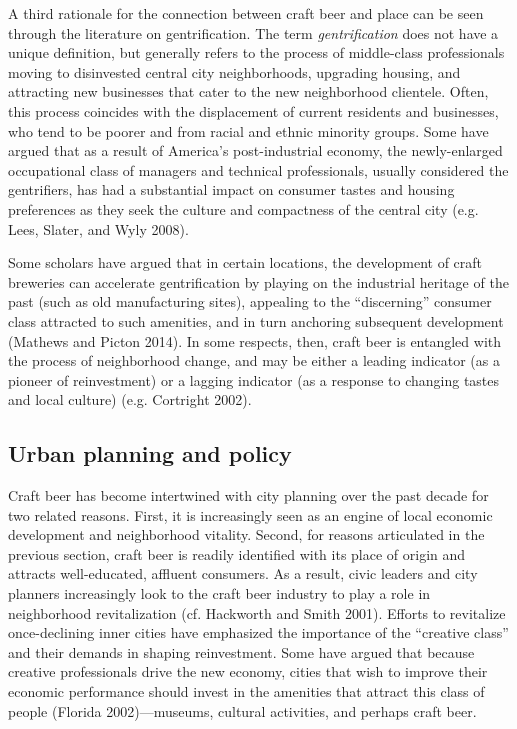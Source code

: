 \documentclass[]{article}
\begin{document}
A third rationale for the connection between craft beer and place can be
seen through the literature on gentrification. The term
\emph{gentrification} does not have a unique definition, but generally
refers to the process of middle-class professionals moving to
disinvested central city neighborhoods, upgrading housing, and
attracting new businesses that cater to the new neighborhood clientele.
Often, this process coincides with the displacement of current residents
and businesses, who tend to be poorer and from racial and ethnic
minority groups. Some have argued that as a result of America's
post-industrial economy, the newly-enlarged occupational class of
managers and technical professionals, usually considered the
gentrifiers, has had a substantial impact on consumer tastes and housing
preferences as they seek the culture and compactness of the central city
(e.g. Lees, Slater, and Wyly 2008).

Some scholars have argued that in certain locations, the development of
craft breweries can accelerate gentrification by playing on the
industrial heritage of the past (such as old manufacturing sites),
appealing to the ``discerning'' consumer class attracted to such
amenities, and in turn anchoring subsequent development (Mathews and
Picton 2014). \protect\hypertarget{move4227634296}{}{}In some respects,
then, craft beer is entangled with the process of neighborhood change,
and may be either a leading indicator (as a pioneer of reinvestment) or
a lagging indicator (as a response to changing tastes and local culture)
(e.g. Cortright 2002).

\subsection{Urban planning and policy}\label{urban-planning-and-policy}

Craft beer has become intertwined with city planning over the past
decade for two related reasons. First, it is increasingly seen as an
engine of local economic development and neighborhood vitality. Second,
for reasons articulated in the previous section, craft beer is readily
identified with its place of origin and attracts well-educated, affluent
consumers. As a result, civic leaders and city planners increasingly
look to the craft beer industry to play a role in neighborhood
revitalization (cf. Hackworth and Smith 2001). Efforts to revitalize
once-declining inner cities have emphasized the importance of the
``creative class'' and their demands in shaping reinvestment. Some have
argued that because creative professionals drive the new economy, cities
that wish to improve their economic performance should invest in the
amenities that attract this class of people (Florida 2002)---museums,
cultural activities, and perhaps craft beer.
\end{document}
